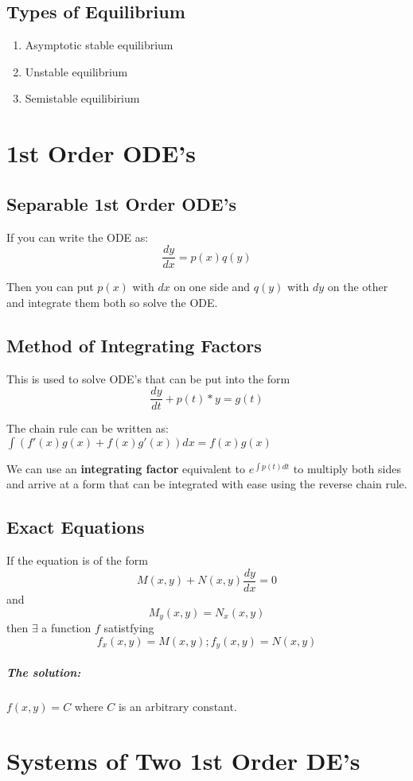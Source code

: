 \documentclass[a4paper,12pt]{report}
\begin{document}
\section{Types of Equilibrium}
\begin{enumerate}
\item Asymptotic stable equilibrium 
\item Unstable equilibrium 
\item Semistable equilibirium
\end{enumerate}

\chapter{1st Order ODE's}
\section{Separable 1st Order ODE's}
If you can write the ODE as: $$\frac{dy}{dx} = p(x)q(y)$$

Then you can put $p(x)$ with $dx$ on one side and $q(y)$ with  $dy$ on the other and 
integrate them both so solve the ODE.

\section{Method of Integrating Factors}
This is used to solve ODE's that can be put into the form 
$$\frac{dy}{dt} + p(t)*y = g(t)$$

The chain rule can be written as: $\int (f'(x)g(x) + f(x)g'(x)) dx =  f(x)g(x)$

We can use an \textbf{integrating factor} equivalent to $e^{\int p(t) dt}$ to multiply
both sides and arrive at a form that can be integrated with ease using the reverse chain 
rule.

\section{Exact Equations}
If the equation is of the form $$M(x, y) + N(x, y) \frac{dy}{dx} = 0$$
and $$M_y(x, y) = N_x(x, y)$$ 
then $\exists$ a function $f$ satistfying $$f_x(x, y) = M(x, y); f_y(x, y) = N(x, y)$$

\paragraph{The solution: } $f(x, y) = C$ where $C$ is an arbitrary constant.

\chapter{Systems of Two 1st Order DE's}
\end{document}
